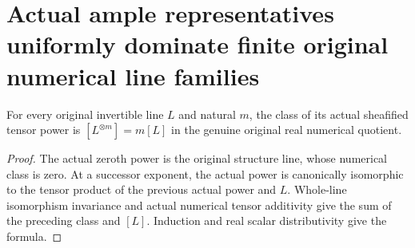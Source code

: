 \section{Actual ample representatives uniformly dominate finite original numerical line families}
\label{sec:native-numerical-ample-domination}

\begin{lemma}
\label{lem:native-numerical-line-tensor-power}
\leanok
{}
For every original invertible line $L$ and natural $m$, the
class of its actual sheafified tensor power is
$[L^{\otimes m}]=m[L]$ in the genuine original real numerical
quotient.
\end{lemma}
\begin{proof}
The actual zeroth power is the original structure line,
whose numerical class is zero. At a successor exponent,
the actual power is canonically isomorphic to the tensor
product of the previous actual power and $L$. Whole-line
isomorphism invariance and actual numerical tensor
additivity give the sum of the preceding class and $[L]$.
Induction and real scalar distributivity give the formula.
\end{proof}

